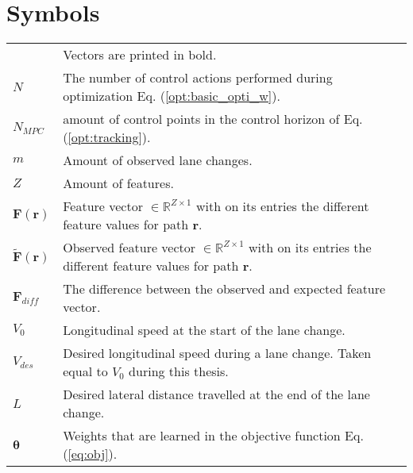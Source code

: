 \documentclass[master=elt,masteroption=eg,english]{kulemt}
\begin{document}
\section*{Symbols}
\begin{flushleft}
  \renewcommand{\arraystretch}{1.1}
  \begin{tabularx}{\textwidth}{@{}p{12mm}X@{}}
  		& Vectors are printed in bold. \\
    $N$    &  The number of control actions performed during optimization Eq. (\ref{opt:basic_opti_w}). \\
    $N_{MPC}$ & amount of control points in the control horizon of Eq. (\ref{opt:tracking}).\\
    $m$ & Amount of observed lane changes.\\
    $Z$ & Amount of features.\\
    $\bm{F(\bm{r})}$ & Feature vector $\in \mathbb{R}^{Z\times 1}$ with on its entries the different feature values for path $\bm{r}$.\\
    $\bm{\tilde{F}(\bm{r})}$ & Observed feature vector $\in \mathbb{R}^{Z\times 1}$ with on its entries the different feature values for path $\bm{r}$.\\
    $\bm{F}_{diff}$ & The difference between the observed and expected feature vector.\\
    $V_{0}$ & Longitudinal speed at the start of the lane change.\\
    $V_{des}$ & Desired longitudinal speed during a lane change. Taken equal to $V_{0}$ during this thesis.\\
   $L$   & Desired lateral distance travelled at the end of the lane change.\\
    $\bm{\theta}$ & Weights that are learned in the objective function Eq. (\ref{eq:obj}).
    
    

    
	\end{tabularx}
\end{flushleft}
\end{document}
